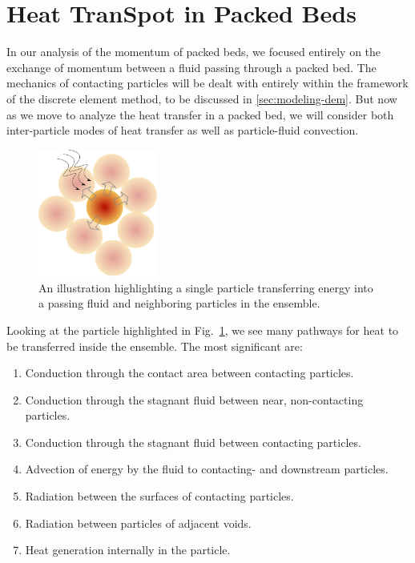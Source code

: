 \section{Heat TranSpot in Packed Beds} \label{sec:modeling-heat-transfer}
In our analysis of the momentum of packed beds, we focused entirely on the exchange of momentum between a fluid passing through a packed bed. The mechanics of contacting particles will be dealt with entirely within the framework of the discrete element method, to be discussed in \cref{sec:modeling-dem}. But now as we move to analyze the heat transfer in a packed bed, we will consider both inter-particle modes of heat transfer as well as particle-fluid convection. 


\begin{figure}[t]
	\centering
	\includegraphics[width=0.35\textwidth]{chapters/figures/pebble-complete-heat-transfer}
	\caption{An illustration highlighting a single particle transferring energy into a passing fluid and neighboring particles in the ensemble.}\label{fig:peb-comp-ht}
\end{figure}

Looking at the particle highlighted in Fig.~\ref{fig:peb-comp-ht}, we see many pathways for heat to be transferred inside the ensemble. The most significant are:

\begin{enumerate}
\item Conduction through the contact area between contacting particles.
\item Conduction through the stagnant fluid between near, non-contacting particles.
\item Conduction through the stagnant fluid between contacting particles.
\item Advection of energy by the fluid to contacting- and downstream particles.
\item Radiation between the surfaces of contacting particles.
\item Radiation between particles of adjacent voids.
\item Heat generation internally in the particle.
\end{enumerate}

